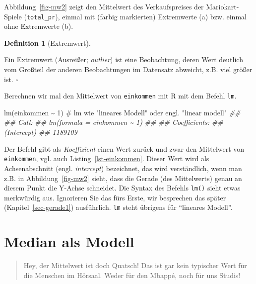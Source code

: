 \documentclass[
  letterpaper,
]{scrbook}
\newenvironment{Shaded}{\begin{snugshade}}{\end{snugshade}}
\newcommand{\CommentTok}[1]{\textcolor[rgb]{0.37,0.37,0.37}{#1}}
\newcommand{\DecValTok}[1]{\textcolor[rgb]{0.68,0.00,0.00}{#1}}
\newcommand{\DocumentationTok}[1]{\textcolor[rgb]{0.37,0.37,0.37}{\textit{#1}}}
\newcommand{\FunctionTok}[1]{\textcolor[rgb]{0.28,0.35,0.67}{#1}}
\newcommand{\NormalTok}[1]{\textcolor[rgb]{0.00,0.23,0.31}{#1}}
\newcommand{\SpecialCharTok}[1]{\textcolor[rgb]{0.37,0.37,0.37}{#1}}
\theoremstyle{definition}
\theoremstyle{definition}
\newtheorem{definition}{Definition}[chapter]
\theoremstyle{definition}
\theoremstyle{remark}
\begin{document}
Abbildung~\ref{fig-mw2} zeigt den Mittelwert des Verkaufspreises der
Mariokart-Spiele (\texttt{total\_pr}), einmal mit (farbig markierten)
Extremwerte (a) bzw. einmal ohne Extremwerte (b).

\begin{definition}[Extremwert]\protect\hypertarget{def-extremwert}{}\label{def-extremwert}

Ein Extremwert (Ausreißer; \emph{outlier}) ist eine Beobachtung, deren
Wert deutlich vom Großteil der anderen Beobachtungen im Datensatz
abweicht, z.B. viel größer ist. \(\square\)

\end{definition}

Berechnen wir mal den Mittelwert von \texttt{einkommen} mit R mit dem
Befehl \texttt{lm}.

\begin{Shaded}
\begin{Highlighting}[]
\FunctionTok{lm}\NormalTok{(einkommen }\SpecialCharTok{\textasciitilde{}} \DecValTok{1}\NormalTok{)  }\CommentTok{\# lm wie "lineares Modell" oder engl. "linear modell"}
\DocumentationTok{\#\# }
\DocumentationTok{\#\# Call:}
\DocumentationTok{\#\# lm(formula = einkommen \textasciitilde{} 1)}
\DocumentationTok{\#\# }
\DocumentationTok{\#\# Coefficients:}
\DocumentationTok{\#\# (Intercept)  }
\DocumentationTok{\#\#     1189109}
\end{Highlighting}
\end{Shaded}

Der Befehl gibt als \emph{Koeffizient} einen Wert zurück und zwar den
Mittelwert von \texttt{einkommen}, vgl. auch
Listing~\ref{lst-einkommen}. Dieser Wert wird als Achsenabschnitt (engl.
\emph{intercept}) bezeichnet, das wird verständlich, wenn man z.B. in
Abbildung~\ref{fig-mw2} sieht, dass die Gerade (des Mittelwerts) genau
an diesem Punkt die Y-Achse schneidet. Die Syntax des Befehls
\texttt{lm()} sieht etwas merkwürdig aus. Ignorieren Sie das fürs Erste,
wir besprechen das später (Kapitel~\ref{sec-gerade1}) ausführlich.
\texttt{lm} steht übrigens für ``lineares Modell''.

\section{Median als Modell}\label{sec-median}

\begin{quote}
{} Hey, der Mittelwert ist doch Quatsch! Das ist gar kein
typischer Wert für die Menschen im Hörsaal. Weder für den Mbappé, noch
für uns Studis!
\end{quote}
\end{document}
